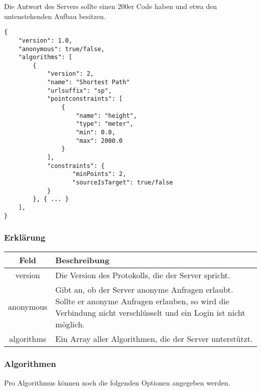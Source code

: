 \documentclass[ngerman]{scrartcl}
\begin{document}
	Die Antwort des Servers sollte einen 200er Code haben und etwa den untenstehenden Aufbau besitzen.
	
	\begin{lstlisting}
{
    "version": 1.0,
    "anonymous": true/false,
    "algorithms": [
        {
            "version": 2,
            "name": "Shortest Path"
            "urlsuffix": "sp",
            "pointconstraints": [                    
                {
                    "name": "height",
                    "type": "meter",
                    "min": 0.0,
                    "max": 2000.0
                }
            ],
            "constraints": {
                   "minPoints": 2,
                   "sourceIsTarget": true/false 
            }
        }, { ... }
    ],
}
    \end{lstlisting}
    
    \subsubsection*{Erklärung}
    
    \begin{tabular}{|c|p{14cm}|}
    	\hline
    	\textbf{Feld} & \textbf{Beschreibung} \\ 
    	\hline \hline
    	
    	version & Die Version des Protokolls, die der Server spricht. \\ 
    	\hline
    	
    	anonymous & Gibt an, ob der Server anonyme Anfragen erlaubt. Sollte er anonyme Anfragen erlauben, so wird die Verbindung nicht verschlüsselt und ein Login ist nicht möglich. \\
    	\hline
    	
    	algorithms & Ein Array aller Algorithmen, die der Server unterstützt. \\
    	\hline
    \end{tabular}
    
    \subsubsection*{Algorithmen}
    
    Pro Algorithmus können noch die folgenden Optionen angegeben werden.
    
\end{document}
